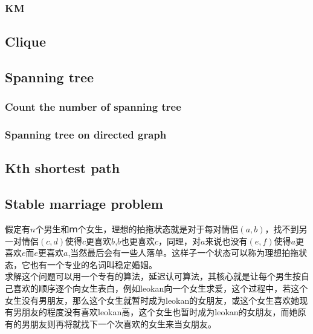 \subsubsection{KM}


\subsection{Clique}


\subsection{Spanning tree}
\subsubsection{Count the number of spanning tree}

\subsubsection{Spanning tree on directed graph}


\subsection{Kth shortest path}


\subsection{Stable marriage problem}
	假定有$n$个男生和$ｍ$个女生，理想的拍拖状态就是对于每对情侣$(a,b)$，找不到另一对情侣$(c,d)$使得$c$更喜欢$b$,$b$也更喜欢$c$，同理，对$a$来说也没有$(e,f)$使得$a$更喜欢$e$而$e$更喜欢$a$,当然最后会有一些人落单。这样子一个状态可以称为理想拍拖状态，它也有一个专业的名词叫稳定婚姻。\\
	求解这个问题可以用一个专有的算法，延迟认可算法，其核心就是让每个男生按自己喜欢的顺序逐个向女生表白，例如leokan向一个女生求爱，这个过程中，若这个女生没有男朋友，那么这个女生就暂时成为leokan的女朋友，或这个女生喜欢她现有男朋友的程度没有喜欢leokan高，这个女生也暂时成为leokan的女朋友，而她原有的男朋友则再将就找下一个次喜欢的女生来当女朋友。

